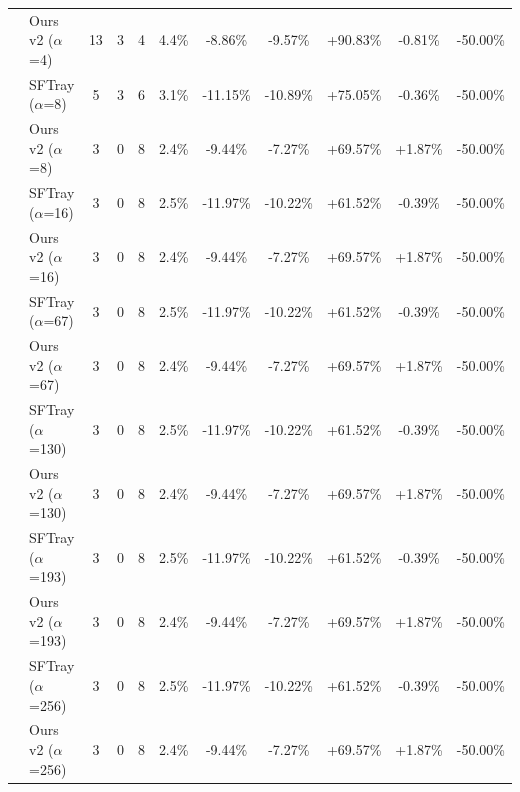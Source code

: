 \begin{table}[t]
{\begin{tabular}{ll|cccc|ccc|cc}
 & Ours v2 ($\alpha$=4) & 13 & 3 & 4 & 4.4\% & -8.86\% & -9.57\% & +90.83\% & -0.81\% & -50.00\% \\

\addlinespace[0.3em]

 & SFTray ($\alpha$=8) & 5 & 3 & 6 & 3.1\% & -11.15\% & -10.89\% & +75.05\% & -0.36\% & -50.00\% \\

 & Ours v2 ($\alpha$=8) & 3 & 0 & 8 & 2.4\% & -9.44\% & -7.27\% & +69.57\% & +1.87\% & -50.00\% \\

\addlinespace[0.3em]

 & SFTray ($\alpha$=16) & 3 & 0 & 8 & 2.5\% & -11.97\% & -10.22\% & +61.52\% & -0.39\% & -50.00\% \\

 & Ours v2 ($\alpha$=16) & 3 & 0 & 8 & 2.4\% & -9.44\% & -7.27\% & +69.57\% & +1.87\% & -50.00\% \\

\addlinespace[0.3em]

 & SFTray ($\alpha$=67) & 3 & 0 & 8 & 2.5\% & -11.97\% & -10.22\% & +61.52\% & -0.39\% & -50.00\% \\

 & Ours v2 ($\alpha$=67) & 3 & 0 & 8 & 2.4\% & -9.44\% & -7.27\% & +69.57\% & +1.87\% & -50.00\% \\

\addlinespace[0.3em]

 & SFTray ($\alpha$=130) & 3 & 0 & 8 & 2.5\% & -11.97\% & -10.22\% & +61.52\% & -0.39\% & -50.00\% \\

 & Ours v2 ($\alpha$=130) & 3 & 0 & 8 & 2.4\% & -9.44\% & -7.27\% & +69.57\% & +1.87\% & -50.00\% \\

\addlinespace[0.3em]

 & SFTray ($\alpha$=193) & 3 & 0 & 8 & 2.5\% & -11.97\% & -10.22\% & +61.52\% & -0.39\% & -50.00\% \\

 & Ours v2 ($\alpha$=193) & 3 & 0 & 8 & 2.4\% & -9.44\% & -7.27\% & +69.57\% & +1.87\% & -50.00\% \\

\addlinespace[0.3em]

 & SFTray ($\alpha$=256) & 3 & 0 & 8 & 2.5\% & -11.97\% & -10.22\% & +61.52\% & -0.39\% & -50.00\% \\

 & Ours v2 ($\alpha$=256) & 3 & 0 & 8 & 2.4\% & -9.44\% & -7.27\% & +69.57\% & +1.87\% & -50.00\% \\


\end{tabular}}
\end{table}

